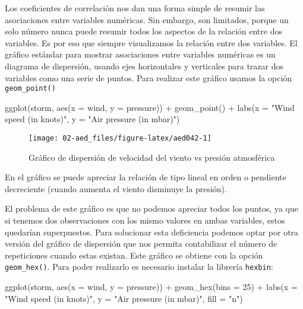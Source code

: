 \documentclass[
]{book}
\newenvironment{Shaded}{\begin{snugshade}}{\end{snugshade}}
\newcommand{\AttributeTok}[1]{\textcolor[rgb]{0.77,0.63,0.00}{#1}}
\newcommand{\DecValTok}[1]{\textcolor[rgb]{0.00,0.00,0.81}{#1}}
\newcommand{\FunctionTok}[1]{\textcolor[rgb]{0.00,0.00,0.00}{#1}}
\newcommand{\NormalTok}[1]{#1}
\newcommand{\SpecialCharTok}[1]{\textcolor[rgb]{0.00,0.00,0.00}{#1}}
\newcommand{\StringTok}[1]{\textcolor[rgb]{0.31,0.60,0.02}{#1}}
\begin{document}
Los coeficientes de correlación nos dan una forma simple de resumir las asociaciones entre variables numéricas. Sin embargo, son limitados, porque un solo número nunca puede resumir todos los aspectos de la relación entre dos variables. Es por eso que siempre visualizamos la relación entre dos variables. El gráfico estándar para mostrar asociaciones entre variables numéricas es un diagrama de dispersión, usando ejes horizontales y verticales para trazar dos variables como una serie de puntos. Para realizar este gráfico usamos la opción \texttt{geom\_point()}

\begin{Shaded}
\begin{Highlighting}[]
\FunctionTok{ggplot}\NormalTok{(storm, }\FunctionTok{aes}\NormalTok{(}\AttributeTok{x =}\NormalTok{ wind, }\AttributeTok{y =}\NormalTok{ pressure)) }\SpecialCharTok{+} 
  \FunctionTok{geom\_point}\NormalTok{() }\SpecialCharTok{+} 
  \FunctionTok{labs}\NormalTok{(}\AttributeTok{x =} \StringTok{"Wind speed (in knots)"}\NormalTok{, }\AttributeTok{y =} \StringTok{"Air pressure (in mbar)"}\NormalTok{)}
\end{Highlighting}
\end{Shaded}

\begin{figure}

{\centering \texttt{[image: 02-aed\_files/figure-latex/aed042-1]} 

}

\caption{Gráfico de dispersión de velocidad del viento vs presión atmosférica}\label{fig:aed042}
\end{figure}

En el gráfico se puede apreciar la relación de tipo lineal en orden o pendiente decreciente (cuando aumenta el viento disminuye la presión).

El problema de este gráfico es que no podemos apreciar todos los puntos, ya que si tenemos dos observaciones con los mismo valores en ambas variables, estos quedarían superpuestos. Para solucionar esta deficiencia podemos optar por otra versión del gráfico de dispersión que nos permita contabilizar el número de repeticiones cuando estas existan. Este gráfico se obtiene con la opción \texttt{geom\_hex()}. Para poder realizarlo es necesario instalar la librería \texttt{hexbin}:

\begin{Shaded}
\begin{Highlighting}[]
\FunctionTok{ggplot}\NormalTok{(storm, }\FunctionTok{aes}\NormalTok{(}\AttributeTok{x =}\NormalTok{ wind, }\AttributeTok{y =}\NormalTok{ pressure)) }\SpecialCharTok{+} 
  \FunctionTok{geom\_hex}\NormalTok{(}\AttributeTok{bins =} \DecValTok{25}\NormalTok{) }\SpecialCharTok{+} 
        \FunctionTok{labs}\NormalTok{(}\AttributeTok{x =} \StringTok{"Wind speed (in knots)"}\NormalTok{, }\AttributeTok{y =} \StringTok{"Air pressure (in mbar)"}\NormalTok{, }\AttributeTok{fill =} \StringTok{"n"}\NormalTok{)}
\end{Highlighting}
\end{Shaded}
\end{document}
